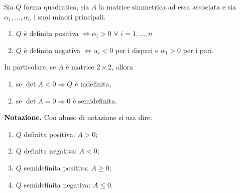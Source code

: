 \begin{proposition}
	Sia $Q$ forma quadratica, sia $A$ la matrice simmetrica ad essa associata e sia $\alpha_1,...,\alpha_n$ i suoi minori principali.
	\begin{enumerate}
		\item $Q$ è definita positiva $\Leftrightarrow \alpha_i >0\,\, \forall \,\, i =1,...,n$
		\item $Q$ è definita negativa $\Leftrightarrow \alpha_i <0 $ per i dispari e $\alpha_1>0$ per i pari. 
	\end{enumerate}
	In particolare, se $A$ è matrice $2 \times 2$, allora
	\begin{enumerate}
		\item se $\det A <0 \Rightarrow Q$ è indefinita,
		\item se $\det A=0 \Rightarrow 0$ è semidefinita.
	\end{enumerate}
\end{proposition}


\begin{attbar}
	\textbf{Notazione.} Con abuso di notazione si usa dire:
	\begin{enumerate}
		\item $Q$ definita positiva: $A >0$; 
		\item $Q$ definita negativa: $A<0$;
		\item $Q$ semidefinita positiva: $A \geq 0$;
		\item $Q$ semidefinita negativa: $A \leq 0$.
	\end{enumerate}
\end{attbar}



